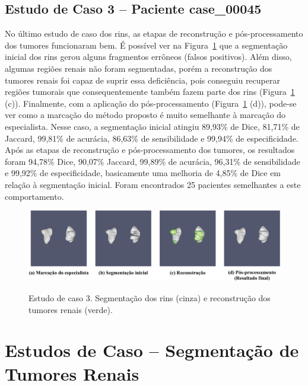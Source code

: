 \subsection{Estudo de Caso 3 – Paciente case\_00045}
\label{sec:estudo-rins-caso-3}

No último estudo de caso dos rins, as etapas de reconstrução e pós-processamento dos tumores funcionaram bem. É possível ver na Figura~\ref{fig:estudo-rins-3} que a segmentação inicial dos rins gerou alguns fragmentos errôneos (falsos positivos). Além disso, algumas regiões renais não foram segmentadas, porém a reconstrução dos tumores renais foi capaz de suprir essa deficiência, pois conseguiu recuperar regiões tumorais que consequentemente também fazem parte dos rins (Figura~\ref{fig:estudo-rins-3} (c)). Finalmente, com a aplicação do pós-processamento (Figura~\ref{fig:estudo-rins-3} (d)), pode-se ver como a marcação do método proposto é muito semelhante à marcação do especialista. Nesse caso, a segmentação inicial atingiu 89,93\% de Dice, 81,71\% de Jaccard, 99,81\% de acurácia, 86,63\% de sensibilidade e 99,94\% de especificidade. Após as etapas de reconstrução e pós-processamento dos tumores, os resultados foram 94,78\% Dice, 90,07\% Jaccard, 99,89\% de acurácia, 96,31\% de sensibilidade e 99,92\% de especificidade, basicamente uma melhoria de 4,85\% de Dice em relação à segmentação inicial. Foram encontrados 25 pacientes semelhantes a este comportamento.

\begin{figure}[!ht]
    \centering
    \caption{Estudo de caso 3. Segmentação dos rins (cinza) e reconstrução dos tumores renais (verde).}
    \includegraphics[width=1\textwidth]{figuras/estudos-casos-rins-3-45.pdf}
    \label{fig:estudo-rins-3}
\end{figure}

\section{Estudos de Caso – Segmentação de Tumores Renais}
\label{sec:estudos-segmentacao-tumores-renais}

